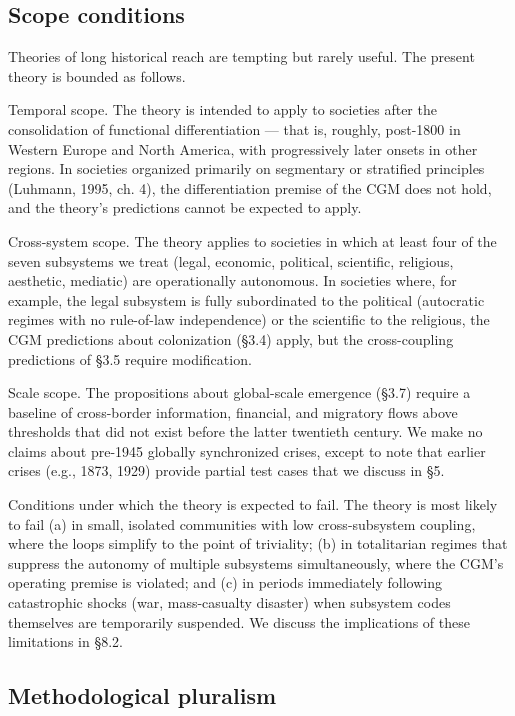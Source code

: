 \documentclass[12pt,a4paper]{article}
\begin{document}
\subsection{Scope conditions}

Theories of long historical reach are tempting but rarely useful. The present theory is bounded as follows.


Temporal scope. The theory is intended to apply to societies after the consolidation of functional differentiation --- that is, roughly, post-1800 in Western Europe and North America, with progressively later onsets in other regions. In societies organized primarily on segmentary or stratified principles (Luhmann, 1995, ch. 4), the differentiation premise of the CGM does not hold, and the theory's predictions cannot be expected to apply.


Cross-system scope. The theory applies to societies in which at least four of the seven subsystems we treat (legal, economic, political, scientific, religious, aesthetic, mediatic) are operationally autonomous. In societies where, for example, the legal subsystem is fully subordinated to the political (autocratic regimes with no rule-of-law independence) or the scientific to the religious, the CGM predictions about colonization (§3.4) apply, but the cross-coupling predictions of §3.5 require modification.


Scale scope. The propositions about global-scale emergence (§3.7) require a baseline of cross-border information, financial, and migratory flows above thresholds that did not exist before the latter twentieth century. We make no claims about pre-1945 globally synchronized crises, except to note that earlier crises (e.g., 1873, 1929) provide partial test cases that we discuss in §5.


Conditions under which the theory is expected to fail. The theory is most likely to fail (a) in small, isolated communities with low cross-subsystem coupling, where the loops simplify to the point of triviality; (b) in totalitarian regimes that suppress the autonomy of multiple subsystems simultaneously, where the CGM's operating premise is violated; and (c) in periods immediately following catastrophic shocks (war, mass-casualty disaster) when subsystem codes themselves are temporarily suspended. We discuss the implications of these limitations in §8.2.

\subsection{Methodological pluralism}
\end{document}
